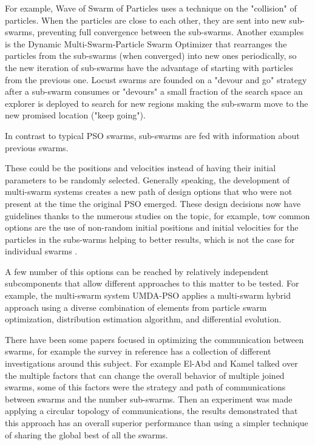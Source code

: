\documentclass[runningheads]{llncs}
\begin{document}
For example, Wave of Swarm of Particles \cite{b6} uses a technique on
the "collision" of particles. %
When the
particles are close to each other, they are sent into new sub-swarms,
preventing full convergence between the sub-swarms. Another examples is the Dynamic Multi-Swarm-Particle
Swarm Optimizer\cite{b7} that rearranges the particles from the sub-swarms
(when converged) into new ones periodically, so the new
iteration of sub-swarms have the advantage of starting with particles from the previous
one. Locust swarms \cite{b8} are founded on a "devour and go" strategy
after a sub-swarm consumes or "devours" a small fraction of the search space an explorer is deployed to search for
new regions making the sub-swarm move to the new promised location ("keep going").

In contrast to typical PSO swarms, sub-swarms are fed with information about
previous swarms. %

These could be the positions and velocities instead of having their initial
parameters to be randomly selected. Generally speaking, the development of
multi-swarm systems creates a new path of design options that who were not
present at the time the original PSO emerged. These design decisions now have
guidelines thanks to the numerous studies on the topic, for example, tow common
options are the use of non-random initial positions and initial velocities for
the particles in the subs-warms helping to better results, which is not the case
for individual swarms \cite{b9}.

A few number of this options can be reached by relatively independent
subcomponents that allow different approaches to this matter to be
tested. For example, the multi-swarm system UMDA-PSO \cite{b10} 
applies a multi-swarm hybrid approach using a diverse combination of 
elements from particle swarm optimization, distribution estimation 
algorithm, and differential evolution.


There have been some papers focused in optimizing the communication
between swarms, for example the survey in reference \cite{b15} has a
collection of different investigations around this subject. For
example El-Abd and Kamel talked over the multiple factors that can
change the overall behavior of multiple joined swarms, some of this factors
were the strategy and path of communications between swarms and the number sub-swarms. 
Then an experiment was made applying a circular topology of communications, 
the results demonstrated that this approach has an overall superior performance 
than using a simpler technique of sharing the global best of all the swarms\cite{b16}. 
\end{document}
